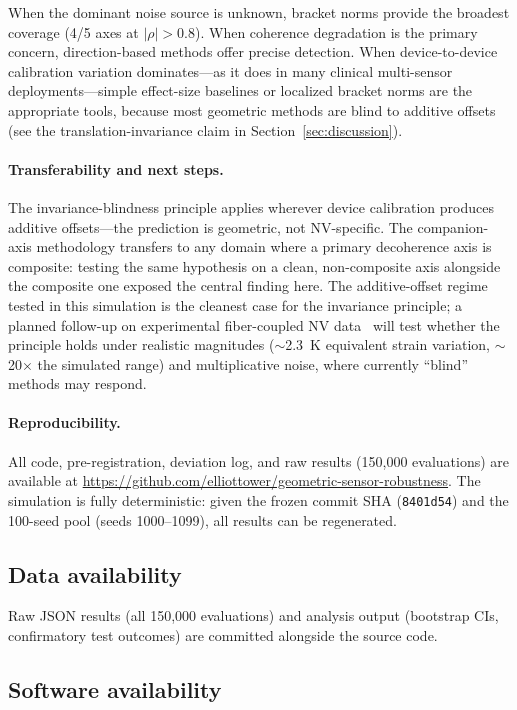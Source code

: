 \documentclass[11pt]{article}
\begin{document}
When the dominant noise source is unknown, bracket norms provide the
broadest coverage (4/5 axes at $|\rho| > 0.8$).  When coherence
degradation is the primary concern, direction-based methods offer
precise detection.  When device-to-device calibration variation
dominates---as it does in many clinical multi-sensor
deployments---simple effect-size baselines or localized bracket norms
are the appropriate tools, because most geometric methods are blind to
additive offsets (see the translation-invariance claim in
Section~\ref{sec:discussion}).

\paragraph{Transferability and next steps.}
The invariance-blindness principle applies wherever device calibration
produces additive offsets---the prediction is
geometric, not NV-specific.  The companion-axis methodology transfers
to any domain where a primary decoherence axis is composite: testing
the same hypothesis on a clean, non-composite axis alongside the
composite one exposed the central finding here.  The additive-offset
regime tested in this simulation is the cleanest case for the
invariance principle; a planned follow-up on experimental fiber-coupled
NV data~\citep{rajpal2025evaluating} will test whether the principle
holds under realistic magnitudes ($\sim$2.3~K equivalent strain
variation, $\sim$20$\times$ the simulated range) and multiplicative
noise, where currently ``blind'' methods may respond.

\paragraph{Reproducibility.}
All code, pre-registration, deviation log, and raw results (150,000
evaluations) are available at
\url{https://github.com/elliottower/geometric-sensor-robustness}.
The simulation is fully deterministic: given the frozen commit SHA
(\texttt{8401d54}) and the 100-seed pool (seeds 1000--1099), all results
can be regenerated.

\subsection*{Data availability}

Raw JSON results (all 150,000 evaluations) and analysis output
(bootstrap CIs, confirmatory test outcomes) are committed alongside
the source code.

\subsection*{Software availability}
\end{document}
